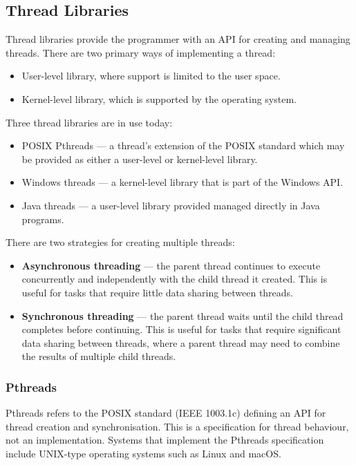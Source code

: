\documentclass{article}
\begin{document}
\subsection{Thread Libraries}
Thread libraries provide the programmer with an API for creating and
managing threads. There are two primary ways of implementing a thread:
\begin{itemize}
    \item User-level library, where support is limited to the user
          space.
    \item Kernel-level library, which is supported by the operating
          system.
\end{itemize}
Three thread libraries are in use today:
\begin{itemize}
    \item POSIX Pthreads --- a thread's extension of the POSIX standard
          which may be provided as either a user-level or kernel-level
          library.
    \item Windows threads --- a kernel-level library that is part of
          the Windows API.\@
    \item Java threads --- a user-level library provided managed
          directly in Java programs.
\end{itemize}
There are two strategies for creating multiple threads:
\begin{itemize}
    \item \textbf{Asynchronous threading} --- the parent thread
          continues to execute concurrently and independently with the
          child thread it created. This is useful for tasks that
          require little data sharing between threads.
    \item \textbf{Synchronous threading} --- the parent thread waits
          until the child thread completes before continuing. This is
          useful for tasks that require significant data sharing
          between threads, where a parent thread may need to combine the
          results of multiple child threads.
\end{itemize}
\subsubsection{Pthreads}
Pthreads refers to the POSIX standard (IEEE 1003.1c) defining an API
for thread creation and synchronisation. This is a specification for
thread behaviour, not an implementation. Systems that implement the
Pthreads specification include UNIX-type operating systems such as
Linux and macOS.\@
\end{document}
